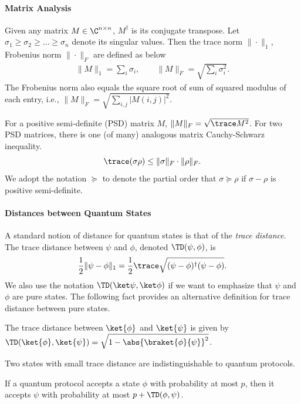 \paragraph{Matrix Analysis} Given any matrix $M\in \C^{n\times n}$, $M^\dagger$ is its  conjugate transpose. Let $\sigma_1 \ge \sigma_2 \ge \ldots \ge \sigma_n$ denote its singular values. Then the trace norm $\|\cdot\|_1$, Frobenius norm $\|\cdot\|_F$ are defined as below
\begin{align*}
    \|M\|_1 = \sum_i \sigma_i, \qquad \|M\|_F = \sqrt{\sum_i \sigma_i^2} .
\end{align*}
The Frobenius norm also equals the square root of sum of squared modulus of each entry, i.e., $\|M\|_F=\sqrt{\sum_{i,j} |M(i,j)|^2}$.

For a positive semi-definite (PSD) matrix $M$, $\|M\|_F = \sqrt{\trace M ^2}$.  
For two PSD matrices, there is one (of many) analogous matrix Cauchy-Schwarz inequality.
\begin{equation}\label{eq:matrix-cauchy-schwarz}
\trace(\sigma\rho)\le \|\sigma\|_F \cdot\|\rho\|_F.
\end{equation}
We adopt the notation $\succeq$ to denote the partial order  that $\sigma \succeq \rho$ if $\sigma-\rho$ is  positive semi-definite.

\paragraph{Distances between Quantum States}
A standard notion of distance for quantum states is that of the \emph{trace distance}. The trace distance between $\psi$ and $\phi$, denoted $\TD(\psi, \phi)$, is 
\begin{align}
\frac{1}{2}\|\psi-\phi\|_1 = \frac{1}{2}\trace\sqrt{( \psi - \phi)^\dagger (\psi-\phi)}.\label{eq:trace-dist}
\end{align}
We also use the notation $\TD(\ket\psi, \ket\phi)$ if we want to emphasize that $\psi$ and $\phi$ are pure states. The following fact provides an alternative definition for trace distance between pure states.
\begin{fact}\label{fact:trace-innerproduct}
  The trace distance between $\ket{\phi}$ and $\ket{\psi}$ is given by $\TD(\ket{\phi},\ket{\psi}) = \sqrt{1-\abs{\braket{\phi}{\psi}}^2}$.
\end{fact}

Two states with small trace distance are indistinguishable to quantum protocols.
\begin{fact}\label{fact:trace_norm_acc}
If a quantum protocol accepts a state $\phi$ with probability at most $p$, then it accepts $\psi$  with
  probability at most $p + \TD(\phi,\psi)$.
\end{fact}


